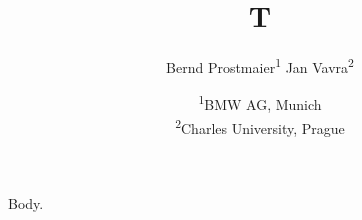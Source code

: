 \documentclass{article}
\title{T}
\author{Bernd Prostmaier\textsuperscript{1} \hspace{0.5em} Jan Vavra\textsuperscript{2}
  \date{\textsuperscript{1}BMW AG, Munich\\
  \textsuperscript{2}Charles University, Prague}}
\begin{document}
\maketitle
Body.
\end{document}
